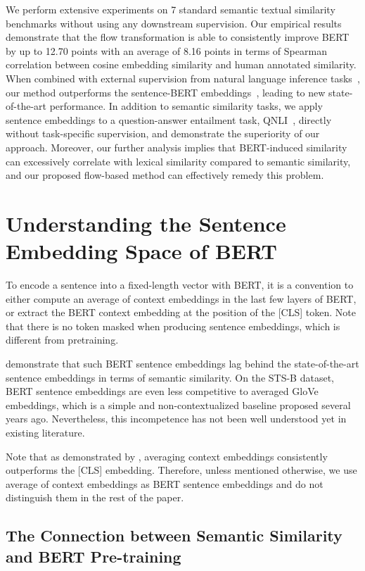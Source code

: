 \documentclass[11pt,a4paper]{article}
\begin{document}
We perform extensive experiments on 7 standard semantic textual similarity benchmarks without using any downstream supervision. Our empirical results demonstrate that the flow transformation is able to consistently improve BERT by up to 12.70 points with an average of 8.16 points in terms of Spearman correlation between cosine embedding similarity and human annotated similarity. When combined with external supervision from natural language inference tasks~\citep{snli,mnli}, our method outperforms the sentence-BERT embeddings~\citep{reimers2019sentence}, leading to new state-of-the-art performance. In addition to semantic similarity tasks, we apply sentence embeddings to a question-answer entailment task, QNLI~\citep{wang2018glue}, directly without task-specific supervision, and demonstrate the superiority of our approach. 
Moreover, our further analysis implies that BERT-induced similarity can excessively correlate with lexical similarity compared to semantic similarity, and our proposed flow-based method can effectively remedy this problem. 


 
\section{Understanding the Sentence Embedding Space of BERT}
\label{sec:2}
To encode a sentence into a fixed-length vector with BERT, it is a convention to either compute an average of context embeddings in the last few layers of BERT, or extract the BERT context embedding at the position of the [CLS] token. Note that there is no token masked when producing sentence embeddings, which is different from pretraining. 

\citet{reimers2019sentence} demonstrate that such BERT sentence embeddings lag behind the state-of-the-art sentence embeddings in terms of semantic similarity. On the STS-B dataset, BERT sentence embeddings are even less competitive to averaged GloVe~\citep{pennington2014glove} embeddings, which is a simple and non-contextualized baseline proposed several years ago. Nevertheless, this incompetence has not been well understood yet in existing literature. 

Note that as demonstrated by \citet{reimers2019sentence}, averaging context embeddings consistently outperforms the [CLS] embedding. Therefore, unless mentioned otherwise, we use average of context embeddings as BERT sentence embeddings and do not distinguish them in the rest of the paper.


\subsection{The Connection between Semantic Similarity and BERT Pre-training}
\label{sec:formalizing:semantic:similarity}
\end{document}
